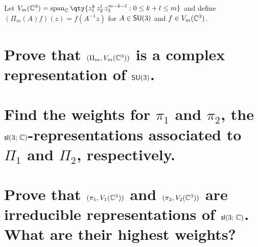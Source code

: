 \documentclass[
	pages,
	boxes,
	color=WildStrawberry
]{homework}
\begin{document}
\begin{problem}
Let $V_{m}(\C^3) = \vspan_{\C}\qty{z_1^k\, z_2^l\, z_3^{m - k - l} : 0 \leq k + l \leq m}$ and define $(\Pi_m(A)f)(z) = f(A^{-1}z)$ for $A \in \mathsf{SU}(3)$ and $f \in V_m(\mathbb{C}^3)$.
\begin{parts}
	\part{Prove that $(\Pi_m, V_m(\mathbb{C}^3))$ is a complex representation of $\mathsf{SU}(3)$.}\label{part:3a}
	\part{Find the weights for $\pi_1$ and $\pi_2$, the $\mathsf{sl}(3;\, \mathbb{C})$-representations associated to $\Pi_1$ and $\Pi_2$, respectively.}\label{part:3b}
	\part{Prove that $(\pi_1, V_1(\mathbb{C}^3))$ and $(\pi_2, V_2(\mathbb{C}^3))$ are irreducible representations of $\mathsf{sl}(3;\, \mathbb{C})$. What are their highest weights?}\label{part:3c}
\end{parts}
\end{problem}
\end{document}

